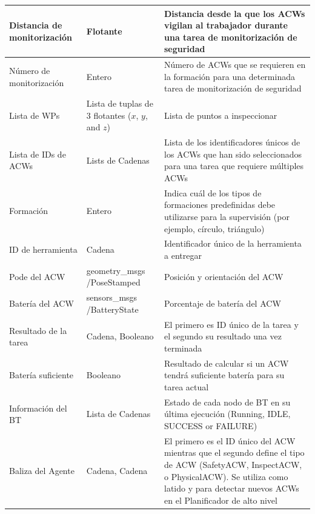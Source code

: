 \documentclass[fontsize=11pt, English=false, Español=true, Myfinal=true, twoside, numbers=noenddot]{scrbook}
\begin{document}
{\begin{table}[htb]
\begin{tabular}{|p{}|p{}|p{}|}
      Distancia de monitorización & Flotante & Distancia desde la que los \glspl{ACW} vigilan al trabajador durante una tarea de monitorización de seguridad  \\ \hline
      
      Número de monitorización & Entero & Número de \glspl{ACW} que se requieren en la formación para una determinada tarea de monitorización de seguridad \\ \hline
      
      Lista de WPs & Lista de tuplas de $3$ flotantes ($x$, $y$, and $z$) & Lista de puntos a inspeccionar \\ \hline
      
      Lista de IDs de \glspl{ACW} & Lists de Cadenas & Lista de los identificadores únicos de los \glspl{ACW} que han sido seleccionados para una tarea que requiere múltiples \glspl{ACW} \\ \hline
      
      Formación & Entero & Indica cuál de los tipos de formaciones predefinidas debe utilizarse para la supervisión (por ejemplo, círculo, triángulo) \\ \hline
      
      ID de herramienta & Cadena & Identificador único de la herramienta a entregar \\ \hline
      
      Pode del \gls{ACW} & geometry\_msgs /PoseStamped & Posición y orientación del \gls{ACW}\\ \hline
      
      Batería del \gls{ACW} & sensors\_msgs /BatteryState & Porcentaje de batería del \gls{ACW} \\ \hline

	    Resultado de la tarea & Cadena, Booleano & El primero es \gls{ID} único de la tarea y el segundo su resultado una vez terminada \\ \hline
      
      Batería suficiente & Booleano & Resultado de calcular si un \gls{ACW} tendrá suficiente batería para su tarea actual \\ \hline

	    Información del \gls{BT} & Lista de Cadenas & Estado de cada nodo de \gls{BT} en su última ejecución (Running, IDLE, SUCCESS or FAILURE) \\ \hline
      
      Baliza del Agente & Cadena, Cadena & El primero es el ID único del \gls{ACW} mientras que el segundo define el tipo de \gls{ACW} (SafetyACW, InspectACW, o PhysicalACW). Se utiliza como latido y para detectar nuevos \glspl{ACW} en el Planificador de alto nivel \\ \hline


\end{tabular}
\end{table}}
\end{document}
